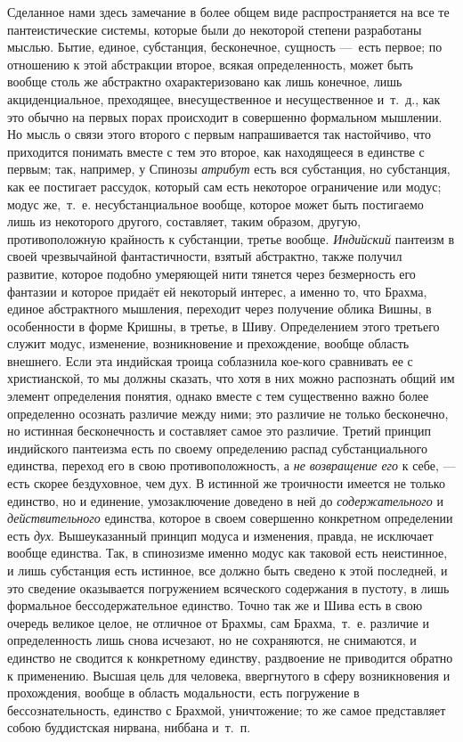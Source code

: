Сделанное нами здесь замечание в более общем виде распространяется на все те
пантеистические системы, которые были до некоторой степени разработаны
мыслью. Бытие, единое, субстанция, бесконечное, сущность —~есть первое; по
отношению к этой абстракции второе, всякая определенность, может быть
вообще столь же абстрактно охарактеризовано как лишь конечное, лишь
акциденциальное, преходящее, внесущественное и несущественное и~т.~д., как
это обычно на первых порах происходит в совершенно формальном мышлении. Но
мысль о связи этого второго с первым напрашивается так настойчиво, что
приходится понимать вместе с тем это второе, как находящееся в единстве с
первым; так, например, у Спинозы {\em атрибут} есть вся
субстанция, но субстанция, как ее постигает рассудок, который сам есть
некоторое ограничение или модус; модус же,~т.~е. несубстанциальное вообще,
которое может быть постигаемо лишь из некоторого другого, составляет, таким
образом, другую, противоположную крайность к субстанции, третье вообще.
{\em Индийский} пантеизм в своей чрезвычайной
фантастичности, взятый абстрактно, также получил развитие, 
которое подобно умеряющей нити тянется через безмерность его фантазии 
и которое придаёт ей некоторый интерес, а именно то, что Брахма, 
единое абстрактного мышления, переходит через получение
облика Вишны, в особенности в форме Кришны, в третье, в Шиву. Определением
этого третьего служит модус, изменение, возникновение и прехождение, вообще
область внешнего. Если эта индийская троица соблазнила кое-кого сравнивать
ее с христианской, то мы должны сказать, что хотя в них можно распознать
общий им элемент определения понятия, однако вместе с тем существенно важно
более определенно осознать различие между ними; это различие не только
бесконечно, но истинная бесконечность и составляет самое это различие.
Третий принцип индийского пантеизма есть по своему определению распад
субстанциального единства, переход его в свою противоположность, а
{\em не возвращение его} к себе, — есть скорее
бездуховное, чем дух. В истинной же троичности имеется не только единство,
но и единение, умозаключение доведено в ней до
{\em содержательного} и
{\em действительного} единства, которое в своем
совершенно конкретном определении есть {\em дух}.
Вышеуказанный принцип модуса и изменения, правда, не исключает вообще
единства. Так, в спинозизме именно модус как таковой есть неистинное, и
лишь субстанция есть истинное, все должно быть сведено к этой последней, и
это сведение оказывается погружением всяческого содержания в пустоту, в
лишь формальное бессодержательное единство. Точно так же и Шива есть в свою
очередь великое целое, не отличное от Брахмы, сам Брахма,~т.~е. различие и
определенность лишь снова исчезают, но не сохраняются, не снимаются, и
единство не сводится к конкретному единству, раздвоение не приводится
обратно к применению. Высшая цель для человека, ввергнутого в сферу
возникновения и прохождения, вообще в область модальности, есть погружение
в бессознательность, единство с Брахмой, уничтожение; то же самое
представляет собою буддистская нирвана, ниббана и~т.~п.

